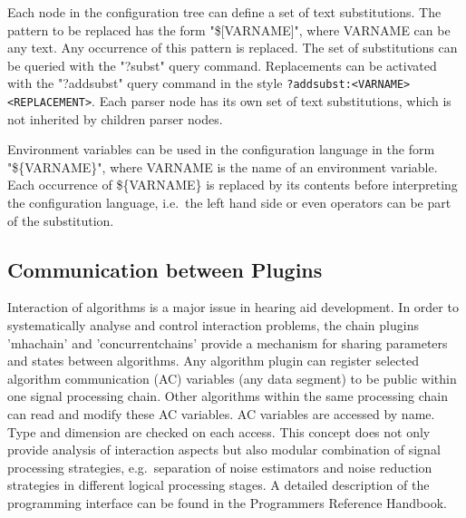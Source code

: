 Each node in the \mha{} configuration tree can define a set of text
substitutions.  The pattern to be replaced has the form "\$[VARNAME]",
where VARNAME can be any text. Any occurrence of this pattern is
replaced. The set of substitutions can be queried with the "?subst"
query command. Replacements can be activated with the "?addsubst"
query command in the style
\verb!?addsubst:<VARNAME> <REPLACEMENT>!. Each parser node has its own
set of text substitutions, which is not inherited by children parser
nodes.

Environment variables can be used in the \mha{} configuration language in the form
"\$\{VARNAME\}", where VARNAME is the name of an environment variable. Each
occurrence of \$\{VARNAME\} is replaced by its contents before interpreting the
\mha{} configuration language, i.e.\ the left hand side or even operators can be part of
the substitution.

\subsection{Communication between \mha{} Plugins}

Interaction of algorithms is a major issue in hearing aid
development. In order to systematically analyse and control
interaction problems, the \mha{} chain plugins 'mhachain' and
'concurrentchains' provide a mechanism for sharing parameters and
states between algorithms. Any algorithm plugin can register selected
algorithm communication (AC) variables (any data segment) to be public
within one signal processing
chain. Other algorithms within the same processing chain can read and
modify these AC variables. AC variables are accessed by name. Type and
dimension are checked on each access. This concept does not only
provide analysis of interaction aspects but also modular combination
of signal processing strategies, e.g.\ separation of noise estimators
and noise reduction strategies in different logical processing
stages. A detailed description of the programming interface can be
found in the Programmers Reference Handbook.



